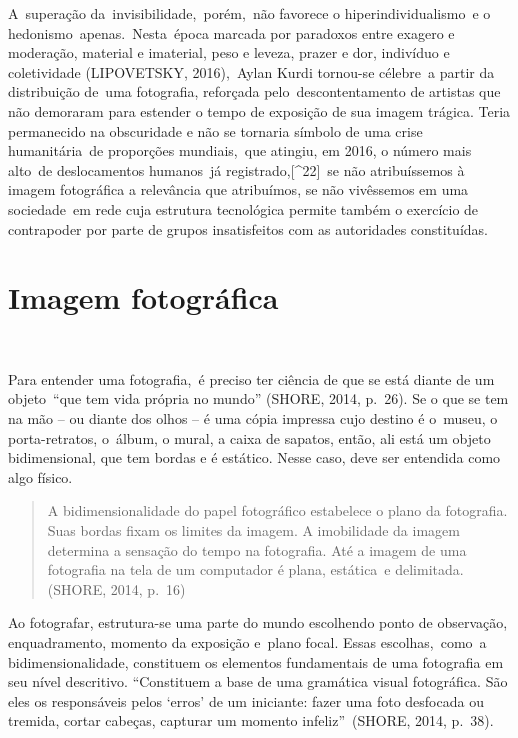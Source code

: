 \documentclass[
  letterpaper,
]{abntex2}
\begin{document}
A~superação da~invisibilidade,~porém,~não favorece o
hiperindividualismo~e o hedonismo~apenas.~Nesta~época marcada por
paradoxos entre exagero e moderação, material e imaterial, peso e
leveza, prazer e dor, indivíduo e coletividade (LIPOVETSKY, 2016),~Aylan
Kurdi tornou-se célebre~a partir da distribuição de~uma fotografia,
reforçada pelo~descontentamento de artistas que não demoraram para
estender o tempo de exposição de sua imagem trágica. Teria permanecido
na obscuridade e não se tornaria símbolo de uma crise humanitária~de
proporções mundiais,~que atingiu, em 2016, o número mais alto~de
deslocamentos humanos~já registrado,{[}\^{}22{]}~se não atribuíssemos à
imagem fotográfica a relevância que atribuímos, se não vivêssemos em uma
sociedade~em rede cuja estrutura tecnológica permite também o exercício
de contrapoder por parte de grupos insatisfeitos com as autoridades
constituídas.~

\hypertarget{imagem-fotogruxe1fica}{%
\section{Imagem fotográfica~}\label{imagem-fotogruxe1fica}}

~

Para entender uma fotografia,~é preciso ter ciência de que se está
diante de um objeto~``que tem vida própria no mundo'' (SHORE, 2014,
p.~26). Se o que se tem na mão -- ou diante dos olhos -- é uma cópia
impressa cujo destino é o~museu, o porta-retratos, o~álbum, o mural, a
caixa de sapatos, então, ali está um objeto bidimensional, que tem
bordas e é estático. Nesse caso, deve ser entendida como algo físico.~ ~

\begin{quote}
A bidimensionalidade do papel fotográfico estabelece o plano da
fotografia. Suas bordas fixam os limites da imagem. A imobilidade da
imagem determina a sensação do tempo na fotografia. Até a imagem de uma
fotografia na tela de um computador é plana, estática~e delimitada.
(SHORE, 2014, p.~16) ~
\end{quote}

Ao fotografar, estrutura-se uma parte do mundo escolhendo ponto de
observação, enquadramento, momento da exposição e~plano focal. Essas
escolhas,~como~a bidimensionalidade, constituem os elementos
fundamentais de uma fotografia em seu nível descritivo. ``Constituem a
base de uma gramática visual fotográfica. São eles os responsáveis pelos
`erros' de um iniciante: fazer uma foto desfocada ou tremida, cortar
cabeças, capturar um momento infeliz''~(SHORE, 2014, p.~38).
\end{document}
